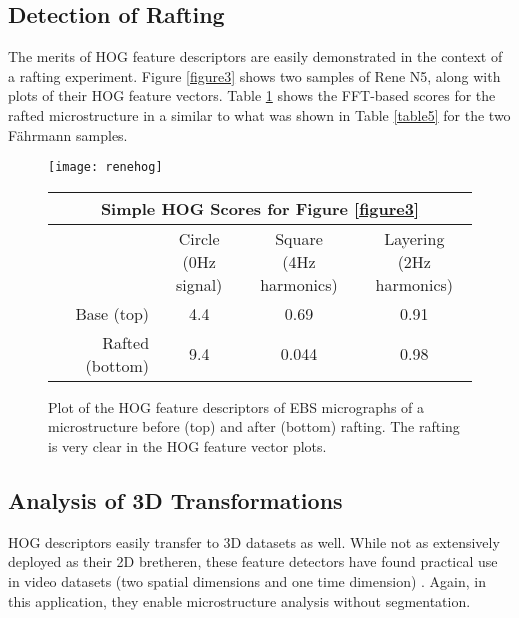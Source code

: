 \documentclass[review]{elsarticle}
\begin{document}
	\subsection{Detection of Rafting}
	The merits of HOG feature descriptors are easily demonstrated in the context of a rafting experiment. Figure \ref{figure3} shows two samples of Rene N5, along with plots of their HOG feature vectors. Table \ref{table2} shows the FFT-based scores for the rafted microstructure in a similar to what was shown in Table \ref{table5} for the two F\"ahrmann\cite{faehrmann} samples.
	
	\begin{figure}[!ht]
		\begin{center}
			\texttt{[image: renehog]}
	  		\caption{ Plot of the HOG feature descriptors of EBS micrographs of a microstructure before (top) and after (bottom) rafting. The rafting is very clear in the HOG feature vector plots. }
	  		\label{figure3}
  		
			\begin{tabular}{ r | c | c | c }
				\multicolumn{4}{c}{Simple HOG Scores for Figure \ref{figure3}} \\
				\hline
				& \shortstack{Circle \\ (0Hz signal)} & \shortstack{Square \\ (4Hz harmonics)} & \shortstack{Layering \\ (2Hz harmonics)} \\
				\hline
				Base (top) & 4.4 & 0.69 & 0.91 \\
				Rafted (bottom) & 9.4 & 0.044 & 0.98 \\
				\hline
			\end{tabular}
			
	  		\label{table2}
		\end{center}
	\end{figure}
	
	\subsection{Analysis of 3D Transformations}
	HOG descriptors easily transfer to 3D datasets as well. While not as extensively deployed as their 2D bretheren, these feature detectors have found practical use in video datasets (two spatial dimensions and one time dimension) \cite{hog3d1}. Again, in this application, they enable microstructure analysis without segmentation.
\end{document}
